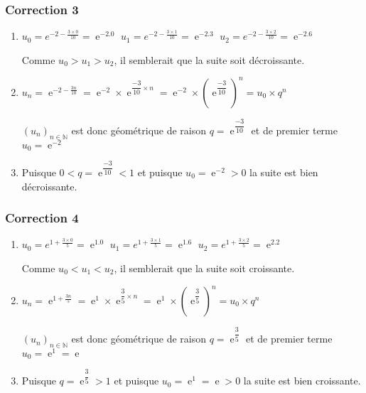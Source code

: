 \documentclass[15pt, mathserif]{beamer}
\DeclareMathOperator{\e}{e}
\newcommand{\N}{\mathbb{N}}			%
\newcommand{\st}[1]{$(#1_n)_{n \in \N}$}
\begin{document}
\begin{frame}
\vspace{-10mm}
	\frametitle{Correction 3}

 \begin{enumerate} 
 	 \item  \hfil$u_0=e^{-2-\frac{3\times 0}{10}}=\e^{-2.0}$ \hfil$u_1=e^{-2-\frac{3\times 1}{10}}=\e^{-2.3} $ \hfil $u_2=e^{-2-\frac{3\times 2}{10}}=\e^{-2.6}$
 
 Comme $u_0>u_1>u_2$, il semblerait que la suite soit décroissante.
 	 \item $u_n=\e^{-2-\frac{3n}{10}}=\e^{-2} \times \e^{\dfrac{-3}{10}\times n} =\e^{-2} \times \left( \e^{\dfrac{-3}{10}} \right)^n=u_0 \times q^n$ 
 
 \st{u} est donc géométrique de raison $q= \e^{\dfrac{-3}{10}}$ et de premier terme $u_0=\e^{-2}$ 
 	 \item Puisque $0<q= \e^{\dfrac{-3}{10}}<1$ et puisque $u_0=\e^{-2}>0$ la suite est bien décroissante.
 \end{enumerate}\end{frame}


\begin{frame}
\vspace{-10mm}
	\frametitle{Correction 4}

 \begin{enumerate} 
 	 \item  \hfil$u_0=e^{1+\frac{3\times 0}{5}}=\e^{1.0}$ \hfil$u_1=e^{1+\frac{3\times 1}{5}}=\e^{1.6} $ \hfil $u_2=e^{1+\frac{3\times 2}{5}}=\e^{2.2}$
 
 Comme $u_0<u_1<u_2$, il semblerait que la suite soit croissante.
 	 \item $u_n=\e^{1+\frac{3n}{5}}=\e^{1} \times \e^{\dfrac{3}{5}\times n} =\e^{1} \times \left( \e^{\dfrac{3}{5}} \right)^n=u_0 \times q^n$ 
 
 \st{u} est donc géométrique de raison $q= \e^{\dfrac{3}{5}}$ et de premier terme $u_0=\e^{1}=\e$ 
 	 \item Puisque $q= \e^{\dfrac{3}{5}}>1$ et puisque $u_0=\e^{1}=\e>0$ la suite est bien croissante.
 \end{enumerate}\end{frame}
\end{document}

